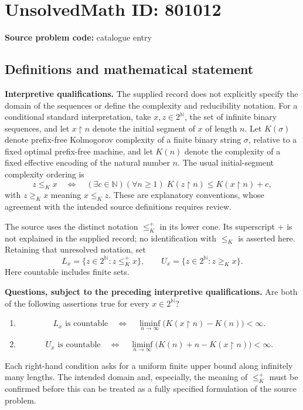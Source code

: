 \documentclass[11pt]{article}
\newcommand{\N}{\mathbb{N}}
\begin{document}
\section*{UnsolvedMath ID: 801012}
\textbf{Source problem code:} catalogue entry
\subsection{Definitions and mathematical statement}
\textbf{Interpretive qualifications.} The supplied record does not explicitly specify the domain of the sequences or define the complexity and reducibility notation. For a conditional standard interpretation, take \(x,z\in 2^{\N}\), the set of infinite binary sequences, and let \(x\upharpoonright n\) denote the initial segment of \(x\) of length \(n\). Let \(K(\sigma)\) denote prefix-free Kolmogorov complexity of a finite binary string \(\sigma\), relative to a fixed optimal prefix-free machine, and let \(K(n)\) denote the complexity of a fixed effective encoding of the natural number \(n\). The usual initial-segment complexity ordering is
\[
z\leq_K x
\quad\Longleftrightarrow\quad
(\exists c\in\N)(\forall n\geq 1)\;
K(z\upharpoonright n)\leq K(x\upharpoonright n)+c,
\]
with \(z\geq_K x\) meaning \(x\leq_K z\). These are explanatory conventions, whose agreement with the intended source definitions requires review.

The source uses the distinct notation \(\leq_K^+\) in its lower cone. Its superscript \(+\) is not explained in the supplied record; no identification with \(\leq_K\) is asserted here. Retaining that unresolved notation, set
\[
L_x=\{z\in 2^{\N}:z\leq_K^+x\},
\qquad
U_x=\{z\in 2^{\N}:z\geq_Kx\}.
\]
Here countable includes finite sets.

\textbf{Questions, subject to the preceding interpretive qualifications.} Are both of the following assertions true for every \(x\in 2^{\N}\)?
\begin{enumerate}
\item
\[
L_x\text{ is countable}
\quad\Longleftrightarrow\quad
\liminf_{n\to\infty}\bigl(K(x\upharpoonright n)-K(n)\bigr)<\infty.
\]
\item
\[
U_x\text{ is countable}
\quad\Longleftrightarrow\quad
\liminf_{n\to\infty}\bigl(K(n)+n-K(x\upharpoonright n)\bigr)<\infty.
\]
\end{enumerate}
Each right-hand condition asks for a uniform finite upper bound along infinitely many lengths. The intended domain and, especially, the meaning of \(\leq_K^+\) must be confirmed before this can be treated as a fully specified formulation of the source problem.
\end{document}
